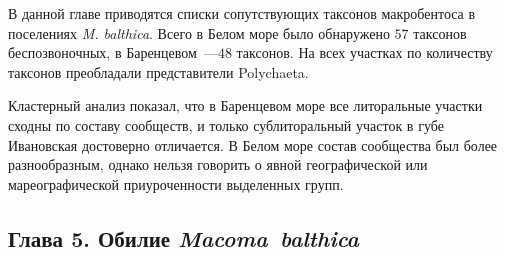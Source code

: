 {В данной главе приводятся списки сопутствующих таксонов макробентоса в поселениях {\it M. balthica}.
Всего в Белом море было обнаружено $57$ таксонов беспозвоночных, в Баренцевом~---$48$ таксонов.
На всех участках по количеству таксонов преобладали представители Polychaeta.

Кластерный анализ показал, что в Баренцевом море все литоральные участки сходны по составу сообществ, и только сублиторальный участок в губе Ивановская достоверно отличается.
В Белом море состав сообщества был более разнообразным, однако нельзя говорить о явной географической или мареографической приуроченности выделенных групп.



\subsection*{Глава 5. Обилие \textit{Macoma~balthica}}

}
